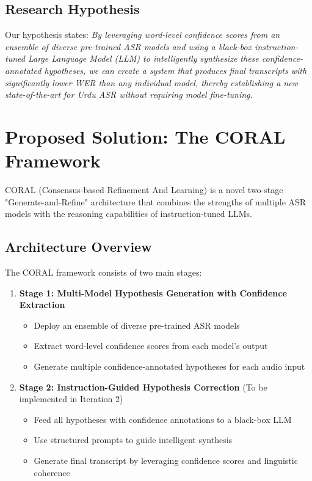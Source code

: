 \subsection{Research Hypothesis}

Our hypothesis states: \textit{By leveraging word-level confidence scores from an ensemble of diverse pre-trained ASR models and using a black-box instruction-tuned Large Language Model (LLM) to intelligently synthesize these confidence-annotated hypotheses, we can create a system that produces final transcripts with significantly lower WER than any individual model, thereby establishing a new state-of-the-art for Urdu ASR without requiring model fine-tuning.}

\section{Proposed Solution: The CORAL Framework}

CORAL (Consensus-based Refinement And Learning) is a novel two-stage "Generate-and-Refine" architecture that combines the strengths of multiple ASR models with the reasoning capabilities of instruction-tuned LLMs.

\subsection{Architecture Overview}

The CORAL framework consists of two main stages:

\begin{enumerate}
    \item \textbf{Stage 1: Multi-Model Hypothesis Generation with Confidence Extraction}
    \begin{itemize}
        \item Deploy an ensemble of diverse pre-trained ASR models
        \item Extract word-level confidence scores from each model's output
        \item Generate multiple confidence-annotated hypotheses for each audio input
    \end{itemize}
    
    \item \textbf{Stage 2: Instruction-Guided Hypothesis Correction} (To be implemented in Iteration 2)
    \begin{itemize}
        \item Feed all hypotheses with confidence annotations to a black-box LLM
        \item Use structured prompts to guide intelligent synthesis
        \item Generate final transcript by leveraging confidence scores and linguistic coherence
    \end{itemize}
\end{enumerate}

